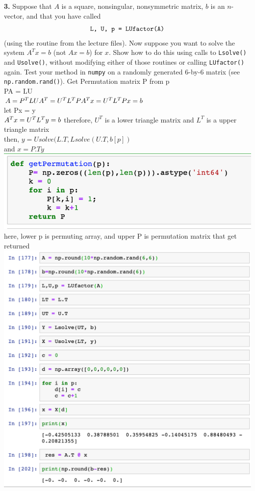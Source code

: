 \documentclass[11pt]{article}
\begin{document}
\par\bigskip
{\bf 3.}
Suppose that $A$ is a square, nonsingular, nonsymmetric matrix, 
$b$ is an $n$-vector, and that you have called 
$$\mbox{\tt L, U, p = LUfactor(A)}$$
(using the routine from the lecture files).
Now suppose you want to solve the system $A^Tx=b$ (not $Ax=b$) for $x$.
Show how to do this using calls to {\tt Lsolve()} and {\tt Usolve()},
without modifying either of those routines or calling {\tt LUfactor()} again.
Test your method in {\tt numpy} on a randomly generated 6-by-6 matrix
(see {\tt np.random.rand()}).
\newline\newline Get Permutation matrix P from p\\
PA = LU\\
$A = P^TLU\\
A^T=U^TL^TP\\
A^Tx = U^TL^TPx =b$\\
let Px = y\\
$A^Tx = U^TL^Ty=b\\
$ therefore, $U^T$ is a lower triangle matrix and $L^T$ is a upper triangle matrix
\\then, $y = Usolve(L.T, Lsolve(U.T, b[p])$\\
and $x = P.Ty$\\
\includegraphics[scale=0.8]{534012.png}\\
here, lower p is permuting array, and upper P is permutation matrix that get returned\\
\includegraphics[scale=0.4]{kk.png}
\newpage
\end{document}
